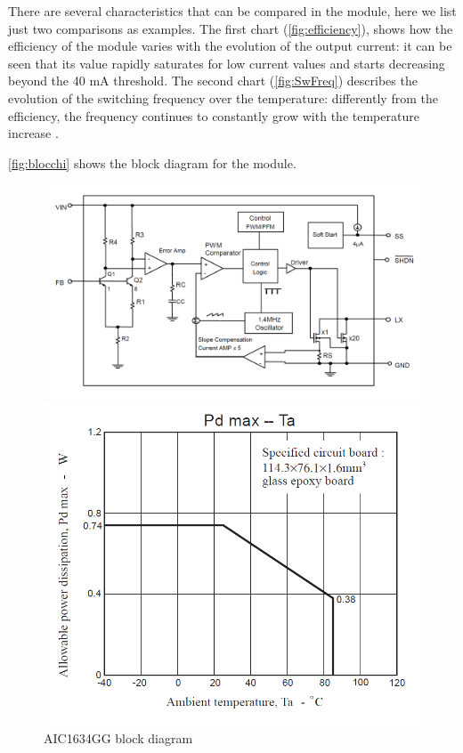 \documentclass[11pt,a4paper,titlepage]{article}
\begin{document}
\begin{description}
          There are several characteristics that can be compared in the module, here we list just two comparisons as examples. The first chart (\autoref{fig:efficiency}), shows how the efficiency of the module varies with the evolution of the output current: it can be seen that its value rapidly saturates for low current values and starts decreasing beyond the 40 mA threshold. The second chart (\autoref{fig:SwFreq}) describes the evolution of the switching frequency over the temperature: differently from the efficiency, the frequency continues to constantly grow with the temperature increase \cite{stepupConv}.

          \autoref{fig:blocchi} shows the block diagram for the module.

          \begin{figure}[h]
            \begin{minipage}{.55\textwidth}
              \centering
              \includegraphics[width = \textwidth]{Schema_blocchi_stepup.png}
              \caption{AIC1634GG block diagram}
              \label{fig:blocchi}
            \end{minipage}
            \hspace{5mm}
            \begin{minipage}{.45\textwidth}
              \centering
              \includegraphics[width = .95\textwidth]{powerVStemp.png}

\end{minipage}
\end{figure}
\end{description}
\end{document}
